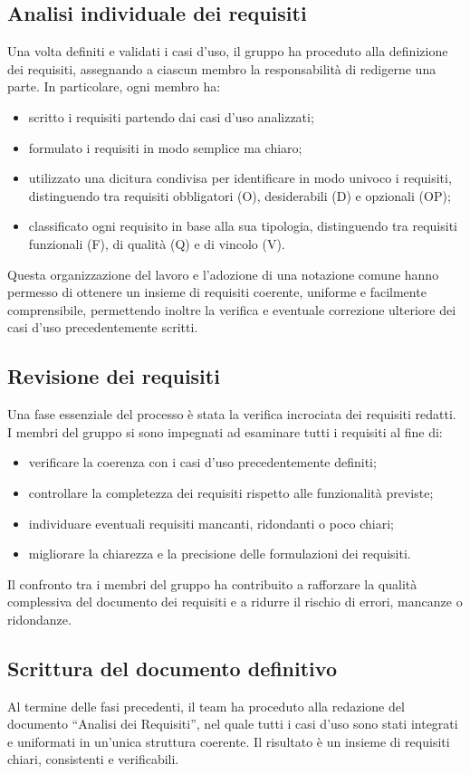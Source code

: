 \documentclass[11pt,a4paper]{article}
\begin{document}
\subsection{Analisi individuale dei requisiti}
Una volta definiti e validati i casi d’uso, il gruppo ha proceduto alla definizione dei requisiti, assegnando a ciascun membro la responsabilità di redigerne una parte. In particolare, ogni membro ha:
\begin{itemize}
\item scritto i requisiti partendo dai casi d’uso analizzati;
\item formulato i requisiti in modo semplice ma chiaro;
\item utilizzato una dicitura condivisa per identificare in modo univoco i requisiti, distinguendo tra requisiti obbligatori (O), desiderabili (D) e opzionali (OP);
\item classificato ogni requisito in base alla sua tipologia, distinguendo tra requisiti funzionali (F), di qualità (Q) e di vincolo (V).
\end{itemize}
Questa organizzazione del lavoro e l’adozione di una notazione comune hanno permesso di ottenere un insieme di requisiti coerente, uniforme e facilmente comprensibile, permettendo inoltre la verifica e eventuale correzione ulteriore dei casi d’uso precedentemente scritti.

\subsection{Revisione dei requisiti}
Una fase essenziale del processo è stata la verifica incrociata dei requisiti redatti. I membri del gruppo si sono impegnati ad esaminare tutti i requisiti al fine di:
\begin{itemize}
\item verificare la coerenza con i casi d’uso precedentemente definiti;
\item controllare la completezza dei requisiti rispetto alle funzionalità previste;
\item individuare eventuali requisiti mancanti, ridondanti o poco chiari;
\item migliorare la chiarezza e la precisione delle formulazioni dei requisiti.
\end{itemize}
Il confronto tra i membri del gruppo ha contribuito a rafforzare la qualità complessiva del documento dei requisiti e a ridurre il rischio di errori, mancanze o ridondanze.

\subsection{Scrittura del documento definitivo}
Al termine delle fasi precedenti, il team ha proceduto alla redazione del documento “Analisi dei Requisiti”, nel quale tutti i casi d’uso sono stati integrati e uniformati in un’unica struttura coerente. Il risultato è un insieme di requisiti chiari, consistenti e verificabili.
\end{document}
